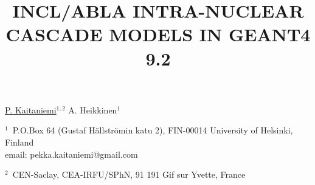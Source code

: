 \documentclass[12pt]{article}
\begin{document}
\title{INCL/ABLA INTRA-NUCLEAR CASCADE MODELS IN GEANT4 9.2}


\underline{P. Kaitaniemi}$^{1, 2}$ A. Heikkinen$^1$ 

$^1$~P.O.Box 64 (Gustaf H\"allstr\"omin katu 2), FIN-00014 University of Helsinki, Finland\\
email: pekka.kaitaniemi@gmail.com

$^2$~CEN-Saclay, CEA-IRFU/SPhN, 91 191 Gif sur Yvette, France
\end{document}
